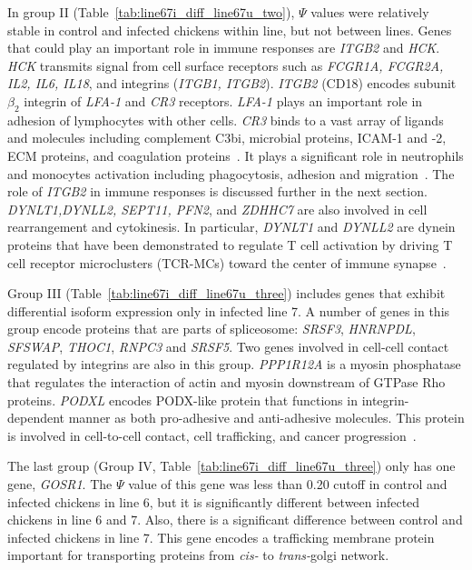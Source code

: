 \documentclass[10pt]{article}
\begin{document}
In group II (Table~\ref{tab:line67i_diff_line67u_two}), $\Psi$ values were
relatively stable in control and infected chickens within line, but not between
lines.  Genes that could play an important role in immune responses are {\em
ITGB2} and {\em HCK}.  {\em HCK} transmits signal from cell surface receptors
such as {\em FCGR1A, FCGR2A, IL2, IL6, IL18}, and integrins ({\em ITGB1,
ITGB2}).  {\em ITGB2} (CD18) encodes subunit $\beta_{2}$ integrin of {\em LFA-1}
and {\em CR3} receptors.  {\em LFA-1} plays an important role in adhesion of
lymphocytes with other cells.  {\em CR3} binds to a vast array of ligands and
molecules including complement C3bi, microbial proteins, ICAM-1 and -2, ECM
proteins, and coagulation proteins~\cite{}.  It plays a significant role in
neutrophils and monocytes activation including phagocytosis, adhesion and
migration~\cite{}.  The role of {\em ITGB2} in immune responses is discussed
further in the next section.  {\em DYNLT1,DYNLL2, SEPT11, PFN2}, and {\em
ZDHHC7} are also involved in cell rearrangement and cytokinesis.  In particular,
{\em DYNLT1} and {\em DYNLL2} are dynein proteins that have been demonstrated to
regulate T cell activation by driving T cell receptor microclusters (TCR-MCs)
toward the center of immune synapse~\cite{hashimoto2011dynein}.

Group III (Table~\ref{tab:line67i_diff_line67u_three}) includes genes that
exhibit differential isoform expression only in infected line 7.  A number of
genes in this group encode proteins that are parts of spliceosome: {\em SRSF3},
{\em HNRNPDL}, {\em SFSWAP}, {\em THOC1}, {\em RNPC3} and {\em SRSF5}.  Two
genes involved in cell-cell contact regulated by integrins are also in this
group.  {\em PPP1R12A} is a myosin phosphatase that regulates the interaction of
actin and myosin downstream of GTPase Rho proteins.  {\em PODXL} encodes
PODX-like protein that functions in integrin-dependent manner as both
pro-adhesive and anti-adhesive molecules.  This protein is involved in
cell-to-cell contact, cell trafficking, and cancer progression~\cite{}.

The last group (Group IV, Table~\ref{tab:line67i_diff_line67u_three}) only has
one gene, {\em GOSR1}.  The $\Psi$ value of this gene was less than 0.20 cutoff
in control and infected chickens in line 6, but it is significantly different
between infected chickens in line 6 and 7.  Also, there is a significant
difference between control and infected chickens in line 7.  This gene encodes a
trafficking membrane protein important for transporting proteins from {\em cis-}
to {\em trans-}golgi network.
\end{document}
